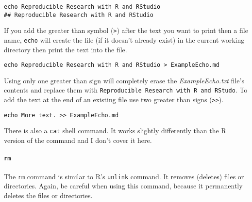 \begin{knitrout}
\color{fgcolor}\begin{kframe}
\begin{verbatim}
echo Reproducible Research with R and RStudio
## Reproducible Research with R and RStudio
\end{verbatim}
\end{kframe}
\end{knitrout}


\noindent If you add the greater than symbol (\verb|>|) after the text you want to print then a file name, \texttt{echo} will create the file (if it doesn't already exist) in the current working directory then print the text into the file.

\begin{knitrout}
\color{fgcolor}\begin{kframe}
\begin{verbatim}
echo Reproducible Research with R and RStudio > ExampleEcho.md
\end{verbatim}
\end{kframe}
\end{knitrout}


\noindent Using only one greater than sign will completely erase the \emph{ExampleEcho.txt} file's contents and replace them with \texttt{Reproducible Research with R and RStudo}. To add the text at the end of an existing file use two greater than signs (\verb|>>|).

\begin{knitrout}
\color{fgcolor}\begin{kframe}
\begin{verbatim}
echo More text. >> ExampleEcho.md
\end{verbatim}
\end{kframe}
\end{knitrout}


\noindent There is also a \texttt{cat} shell command. It works slightly differently than the R version of the command and I don't cover it here.

\paragraph{{\tt{rm}}}

The {\tt{rm}} command is similar to R's {\tt{unlink}} command. It removes (deletes) files or directories. Again, be careful when using this command, because it permanently deletes the files or directories.

